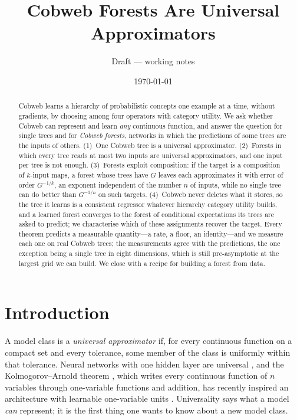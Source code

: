 \documentclass[11pt]{article}
\title{Cobweb Forests Are Universal Approximators}
\author{Draft --- working notes}
\date{\today}
\theoremstyle{definition}
\theoremstyle{remark}
\begin{document}
\maketitle

\begin{abstract}
Cobweb learns a hierarchy of probabilistic concepts one example at a time, without
gradients, by choosing among four operators with category utility.  We ask whether
Cobweb can represent and learn \emph{any} continuous function, and answer the question
for single trees and for \emph{Cobweb forests}, networks in which the predictions of some
trees are the inputs of others.  (1)~One Cobweb tree is a universal approximator.
(2)~Forests in which every tree reads at most two inputs are universal approximators, and
one input per tree is not enough.  (3)~Forests exploit composition: if the target is a
composition of $k$-input maps, a forest whose trees have $G$ leaves each approximates it
with error of order $G^{-1/k}$, an exponent independent of the number $n$ of inputs,
while no single tree can do better than $G^{-1/n}$ on such targets.  (4)~Cobweb never deletes what it stores, so the tree it learns is a
consistent regressor whatever hierarchy category utility builds, and a learned forest
converges to the forest of conditional expectations its trees are asked to predict; we
characterise which of these assignments recover the target.  Every theorem predicts a
measurable quantity---a rate, a floor, an identity---and we measure each one on real
Cobweb trees; the measurements agree with the predictions, the one exception being a
single tree in eight dimensions, which is still pre-asymptotic at the largest grid we can
build.  We close with a recipe for
building a forest from data.
\end{abstract}

\tableofcontents

\section{Introduction}\label{sec:intro}

A model class is a \emph{universal approximator} if, for every continuous function on a
compact set and every tolerance, some member of the class is uniformly within that
tolerance.  Neural networks with one hidden layer are universal \citep{cybenko1989,hornik1989},
and the Kolmogorov--Arnold theorem \citep{kolmogorov1957,arnold1957}, which writes every
continuous function of $n$ variables through one-variable functions and addition, has
recently inspired an architecture with learnable one-variable units
\citep{liu2024kan}.  Universality says what a model \emph{can} represent; it is the first
thing one wants to know about a new model class.
\end{document}
